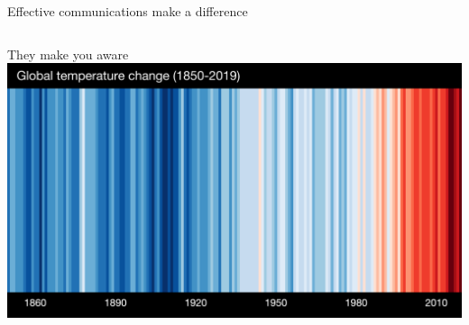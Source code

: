 \begin{frame}{Effective communications make a difference}

\vspace{-0.75cm}
\begin{columns}

    \begin{column}{0.3\textwidth}
        \begin{block}{They make you aware}
        \centering
            \includegraphics[width=\textwidth]{images/_stripes_GLOBE---1850-2019-MO-withlabels.png}
        \end{block}
    \end{column}
    

\end{columns}
\end{frame}
